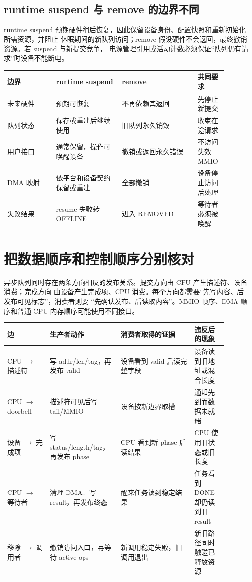 \subsection{runtime suspend 与 remove 的边界不同}

runtime suspend 预期硬件稍后恢复，因此保留设备身份、配置快照和重新初始化所需资源，并阻止
休眠期间的新队列访问；remove 假设硬件不会返回，最终撤销资源。若 suspend 与新提交竞争，
电源管理引用或活动计数必须保证“队列仍有请求”时设备不能断电。

\begin{longtable}{|L{0.2\linewidth}|L{0.27\linewidth}|L{0.31\linewidth}|L{0.12\linewidth}|}
\hline
边界 & runtime suspend & remove & 共同要求 \\ \hline
未来硬件 & 预期可恢复 & 不再依赖其返回 & 先停止新提交 \\\tablerowrule
队列状态 & 保存或重建后继续使用 & 旧队列永久销毁 & 收束在途请求 \\\tablerowrule
用户接口 & 通常保留，操作可唤醒设备 & 撤销或返回永久错误 & 不访问失效 MMIO \\\tablerowrule
DMA 映射 & 依平台和设备契约保留或重建 & 全部撤销 & 设备停止访问后处理 \\\tablerowrule
失败结果 & resume 失败转 OFFLINE & 进入 REMOVED & 等待者必须被唤醒 \\ \hline
\end{longtable}

\section{把数据顺序和控制顺序分别核对}

异步队列同时存在两条方向相反的发布关系。提交方向由 CPU 产生描述符、设备消费；完成方向
由设备产生完成项、CPU 消费。每个方向都需要“先写内容、后发布可见标志”，消费者则要
“先确认发布、后读取内容”。MMIO 顺序、DMA 顺序和普通 CPU 内存顺序可能使用不同接口。

\begin{longtable}{|L{0.18\linewidth}|L{0.27\linewidth}|L{0.31\linewidth}|L{0.14\linewidth}|}
\hline
边 & 生产者动作 & 消费者取得的证据 & 违反后的现象 \\ \hline
CPU $\rightarrow$ 描述符 & 写 addr/len/tag，再发布 valid & 设备看到 valid 后读完整字段 &
设备读到旧地址或混合长度 \\\tablerowrule
CPU $\rightarrow$ doorbell & 描述符可见后写 tail/MMIO & 设备按新边界取槽 &
通知先到而数据未就绪 \\\tablerowrule
设备 $\rightarrow$ 完成项 & 写 status/length/tag，再发布 phase & CPU 看到新 phase 后读结果 &
CPU 使用旧状态或旧长度 \\\tablerowrule
CPU $\rightarrow$ 等待者 & 清理 DMA、写 result，再发布终态 & 醒来任务读到稳定结果 &
任务看到 DONE 却仍读到旧 result \\\tablerowrule
移除 $\rightarrow$ 调用者 & 撤销访问入口，再等待 active ops & 新调用稳定失败，旧调用退出 &
新旧路径同时触碰已释放资源 \\ \hline
\end{longtable}

